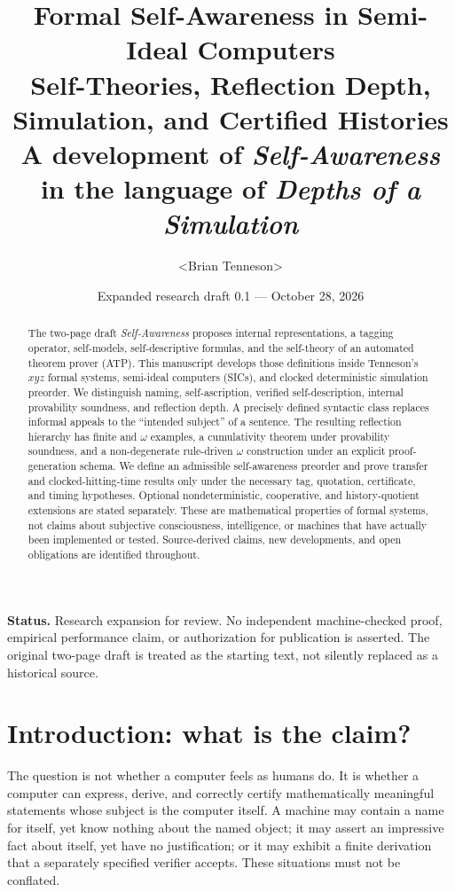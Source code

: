 \documentclass[11pt,letterpaper]{article}
\title{\bfseries Formal Self-Awareness in Semi-Ideal Computers\\[3pt]
\large Self-Theories, Reflection Depth, Simulation, and Certified Histories\\[6pt]
\normalsize A development of \emph{Self-Awareness} in the language of \emph{Depths of a Simulation}}
\author{\textless{}Brian Tenneson\textgreater{}}
\date{Expanded research draft 0.1 --- October 28, 2026}
\theoremstyle{definition}\newtheorem{definition}[theorem]{Definition}\newtheorem{example}[theorem]{Example}\newtheorem{protocol}[theorem]{Protocol}\newtheorem{question}[theorem]{Open Problem}
\theoremstyle{remark}\newtheorem{remark}[theorem]{Remark}
\begin{document}
\maketitle
\begin{abstract}
The two-page draft \emph{Self-Awareness} proposes internal representations, a tagging operator, self-models, self-descriptive formulas, and the self-theory of an automated theorem prover (ATP). This manuscript develops those definitions inside Tenneson's $xyz$ formal systems, semi-ideal computers (SICs), and clocked deterministic simulation preorder. We distinguish naming, self-ascription, verified self-description, internal provability soundness, and reflection depth. A precisely defined syntactic class replaces informal appeals to the ``intended subject'' of a sentence. The resulting reflection hierarchy has finite and $\omega$ examples, a cumulativity theorem under provability soundness, and a non-degenerate rule-driven $\omega$ construction under an explicit proof-generation schema. We define an admissible self-awareness preorder and prove transfer and clocked-hitting-time results only under the necessary tag, quotation, certificate, and timing hypotheses. Optional nondeterministic, cooperative, and history-quotient extensions are stated separately. These are mathematical properties of formal systems, not claims about subjective consciousness, intelligence, or machines that have actually been implemented or tested. Source-derived claims, new developments, and open obligations are identified throughout.
\end{abstract}
\noindent\textbf{Status.} Research expansion for review. No independent machine-checked proof, empirical performance claim, or authorization for publication is asserted. The original two-page draft is treated as the starting text, not silently replaced as a historical source.
\tableofcontents
\clearpage

\section{Introduction: what is the claim?}
The question is not whether a computer feels as humans do. It is whether a computer can express, derive, and correctly certify mathematically meaningful statements whose subject is the computer itself. A machine may contain a name for itself, yet know nothing about the named object; it may assert an impressive fact about itself, yet have no justification; or it may exhibit a finite derivation that a separately specified verifier accepts. These situations must not be conflated.
\end{document}
